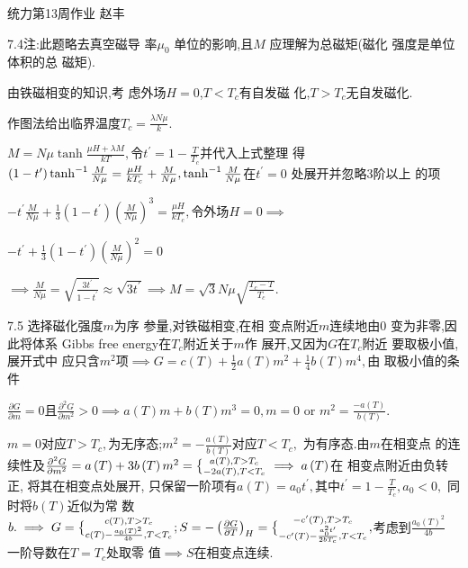\documentclass{ctexart}
\def\QATOPD#1#2#3#4{{#3 \atopwithdelims#1#2 #4}}%
\begin{document}
\bigskip \bigskip 统力第13周作业 \qquad 
赵丰

7.4注:此题略去真空磁导%
率$\mu _{0}$ 单位的影响,且$M$%
应理解为总磁矩(磁化%
强度是单位体积的总%
磁矩).

由铁磁相变的知识,考%
虑外场$H=0$,$T<T_{c}$有自发磁%
化,$T>T_{c}$无自发磁化.

作图法给出临界温度$%
T_{c}=\frac{\lambda N\mu }{k}.$

\bigskip $M=N\mu \tanh \frac{\mu H+\lambda M}{kT},$令$t^{\prime }=1-%
\frac{T}{T_{c}}$并代入上式整理%
得$\left( 1-t^{\prime }\right) \tanh ^{-1}\frac{M}{N\mu }=\frac{\mu H}{%
kT_{c}}+\frac{M}{N\mu },\tanh ^{-1}\frac{M}{N\mu }$在$t^{\prime }=0$%
处展开并忽略3阶以上%
的项

$-t^{\prime }\frac{M}{N\mu }+\frac{1}{3}\left( 1-t^{\prime }\right) \left( 
\frac{M}{N\mu }\right) ^{3}=\frac{\mu H}{kT_{c}},$令外场$%
H=0\implies $

$-t^{\prime }+\frac{1}{3}\left( 1-t^{\prime }\right) \left( \frac{M}{N\mu }%
\right) ^{2}=0$

$\implies \frac{M}{N\mu }=\sqrt{\frac{3t^{\prime }}{1-t^{\prime }}}\approx 
\sqrt{3t^{\prime }}\implies M=\sqrt{3}N\mu \sqrt{\frac{T_{c}-T}{T_{c}}}.$

7.5 选择磁化强度$m$为序%
参量,对铁磁相变,在相%
变点附近$m$连续地由$0$%
变为非零,因此将体系%
Gibbs free energy在$T_{c}$附近关于$m$作%
展开,又因为$G$在$T_{c}$附近%
要取极小值,展开式中%
应只含$m^{2}$项$\implies G=c\left( T\right) +\frac{1%
}{2}a\left( T\right) m^{2}+\frac{1}{4}b\left( T\right) m^{4},$由%
取极小值的条件

$\frac{\partial G}{\partial m}=0$且$\frac{\partial ^{2}G}{\partial
m^{2}}>0\implies a\left( T\right) m+b\left( T\right) m^{3}=0,m=0$ or $m^{2}=%
\frac{-a\left( T\right) }{b\left( T\right) }.$

$m=0$对应$T>T_{c},$为无序态;$m^{2}=-%
\frac{a\left( T\right) }{b\left( T\right) }$对应$T<T_{c},$%
为有序态.由$m$在相变点%
的连续性及$\frac{\partial ^{2}G}{\partial m^{2}%
}=a\left( T\right) +3b\left( T\right) m^{2}=\QATOPD\{ . {a\left( T\right)
,T>T_{c}}{-2a\left( T\right) ,T<T_{c}}\implies a\left( T\right) $在%
相变点附近由负转正,%
将其在相变点处展开,%
只保留一阶项有$a\left( T\right)
=a_{0}t^{\prime },$其中$t^{\prime }=1-\frac{T}{T_{c}},a_{0}<0,$%
同时将$b\left( T\right) $近似为常%
数$b.\implies G=\QATOPD\{ . {c\left( T\right) ,T>T_{c}}{c\left(
T\right) -\frac{a_{0}\left( T\right) ^{2}}{4b},T<T_{c}};S=-\left( \frac{%
\partial G}{\partial T}\right) _{H}=\QATOPD\{ . {-c^{\prime }\left( T\right)
,T>T_{c}}{-c^{\prime }\left( T\right) -\frac{a_{0}^{2}t^{\prime }}{2bT_{c}}%
,T<T_{c}},$考虑到$\frac{a_{0}\left( T\right) ^{2}}{4b}$%
一阶导数在$T=T_{c}$处取零%
值$\implies S$在相变点连续.
\end{document}
